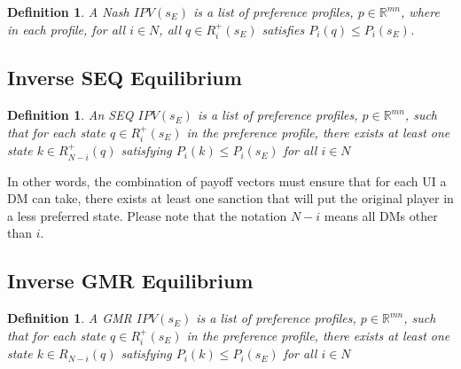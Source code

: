 \documentclass[letterpaper,12pt,titlepage,oneside,final]{book}
\newtheorem{definition}[lemma]{Definition}
\begin{document}
\begin{definition}
\rm
A \emph{Nash $IPV(s_E)$} is a list of preference profiles, $p \in \mathbb{R}^{mn}$, where in each profile, for all $i \in N$, all $q \in R^{+}_{i}(s_E)$ satisfies $P_i(q)\leq P_i(s_E)$.
\end{definition}

\subsection{Inverse SEQ Equilibrium}

\begin{definition}
\rm
\label{def:seq_inv}
An \emph{SEQ $IPV(s_E)$} is a list of preference profiles, $p \in \mathbb{R}^{mn}$, such that for each state $q \in R^{+}_{i}(s_E)$ in the preference profile, there exists at least one state $k\in R^{+}_{N-i}(q)$ satisfying $P_i(k)\leq P_i(s_E)$ for all %
$i \in N$ 
\end{definition}

In other words, the combination of payoff vectors must ensure that for each UI a DM can take, there exists at least one sanction that will put the original player in a less preferred state. Please note that the notation $N-i$ means all DMs other than $i$.



\subsection{Inverse GMR Equilibrium}

\begin{definition}
\label{def:gmr_inv}
\rm
A \emph{GMR $IPV(s_E)$} is a list of preference profiles, $p \in \mathbb{R}^{mn}$, such that for each state $q \in R^{+}_{i}(s_E)$ in the preference profile, there exists at least one state $k\in R_{N-i}(q)$ satisfying $P_i(k)\leq P_i(s_E)$ for all %
$i \in N$ 
\end{definition}

\end{document}
